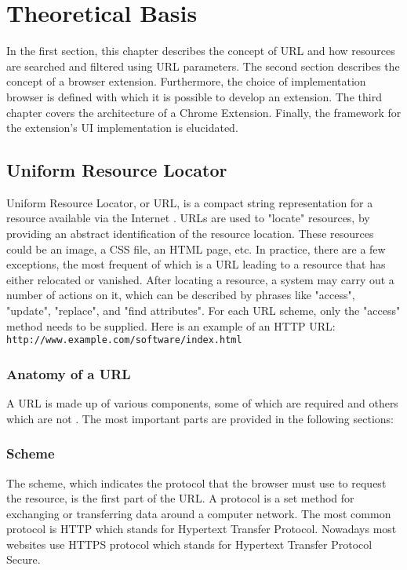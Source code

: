 \newpage
\chapter{Theoretical Basis}
In the first section, this chapter describes the concept of URL and how resources are searched and filtered using URL parameters. The second section describes the concept of a browser extension. Furthermore, the choice of implementation browser is defined with which it is possible to develop an extension. The third chapter covers the architecture of a Chrome Extension. Finally, the framework for the extension's UI implementation is elucidated.


\section{Uniform Resource Locator}
Uniform Resource Locator, or URL, is a compact string representation for a resource available via the Internet \autocite{berners1994uniform}. URLs are used to "locate" resources, by providing an abstract identification of the resource location. These resources could be an image, a CSS file, an HTML page, etc. In practice, there are a few exceptions, the most frequent of which is a URL leading to a resource that has either relocated or vanished. After locating a resource, a system may carry out a number of actions on it, which can be described by phrases like "access", "update", "replace", and "find attributes". For each URL scheme, only the "access" method needs to be supplied. Here is an example of an HTTP URL: \texttt{http://www.example.com/software/index.html}

\subsection{Anatomy of a URL}
A URL is made up of various components, some of which are required and others which are not \autocite{mozilla2022url}. The most important parts are provided in the following sections:

\subsection*{Scheme}
The scheme, which indicates the protocol that the browser must use to request the resource, is the first part of the URL. A protocol is a set method for exchanging or transferring data around a computer network. The most common protocol is HTTP which stands for Hypertext Transfer Protocol. Nowadays most websites use HTTPS protocol which stands for Hypertext Transfer Protocol Secure.

